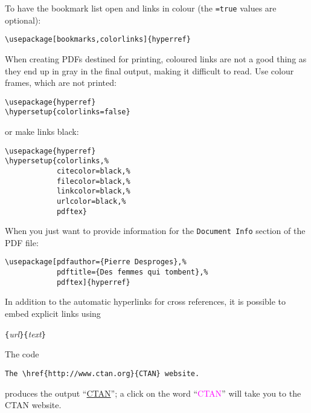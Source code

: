 To have the bookmark list open and links in colour
(the \texttt{=true} values are optional):
\begin{code}
\begin{verbatim}
\usepackage[bookmarks,colorlinks]{hyperref}
\end{verbatim}
\end{code}

When creating PDFs destined for printing, coloured links are not a
  good thing as they end up in gray in the final output, making it
  difficult to read. Use colour frames, which are not printed:
\begin{code}
\begin{verbatim}
\usepackage{hyperref}
\hypersetup{colorlinks=false}
\end{verbatim}
\end{code}
\noindent or make links black:
\begin{code}
\begin{verbatim}
\usepackage{hyperref}
\hypersetup{colorlinks,%
            citecolor=black,%
            filecolor=black,%
            linkcolor=black,%
            urlcolor=black,%
            pdftex}
\end{verbatim}
\end{code}

When you just want to provide information for the
  \texttt{Document Info} section of the PDF file:
\begin{code}
\begin{verbatim}
\usepackage[pdfauthor={Pierre Desproges},%
            pdftitle={Des femmes qui tombent},%
            pdftex]{hyperref}
\end{verbatim}
\end{code}

\vspace{\baselineskip}

In addition to the automatic hyperlinks for cross references, it is
possible to embed explicit links using
\begin{lscommand}
\verb|{|\emph{url}\verb|}{|\emph{text}\verb|}|
\end{lscommand}

The code
\begin{code}
\begin{verbatim}
The \href{http://www.ctan.org}{CTAN} website.
\end{verbatim}
\end{code}
produces the output ``\href{http://www.ctan.org}{CTAN}'';
a click on the word ``\textcolor{magenta}{CTAN}''
will take you to the CTAN website.

